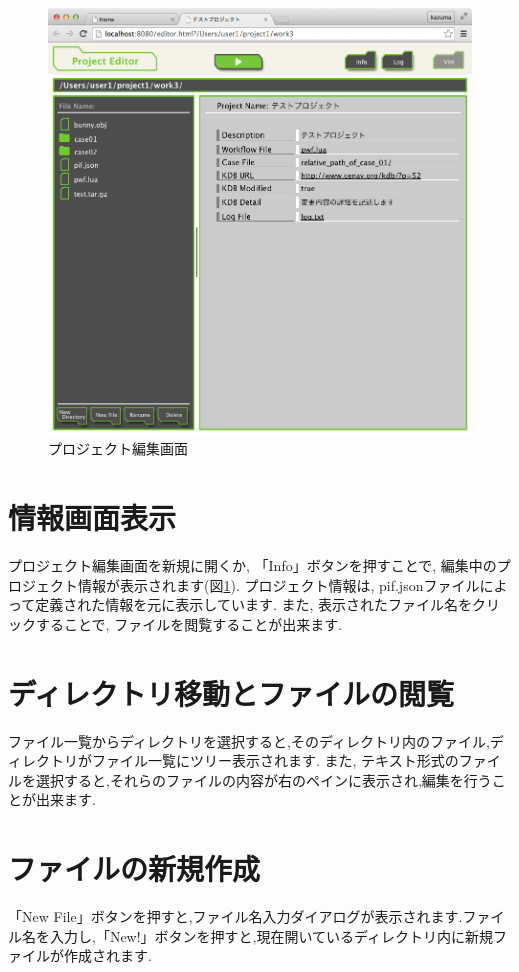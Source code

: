 \documentclass[a4paper,10pt,oneside]{jsbook}
\begin{document}
\begin{figure}[htbp]
	\begin{center}
		\includegraphics[width=12.0cm]{image/projeditor_000.png}
	\end{center}
	\caption{プロジェクト編集画面}
	\label{fig:projeditor}
\end{figure}

\newpage


\section{情報画面表示}
プロジェクト編集画面を新規に開くか, 「Info」ボタンを押すことで, 編集中のプロジェクト情報が表示されます(図\ref{fig:projeditor}). 
プロジェクト情報は, pif.jsonファイルによって定義された情報を元に表示しています.
また, 表示されたファイル名をクリックすることで, ファイルを閲覧することが出来ます.

\section{ディレクトリ移動とファイルの閲覧}
ファイル一覧からディレクトリを選択すると,そのディレクトリ内のファイル,ディレクトリがファイル一覧にツリー表示されます. また, テキスト形式のファイルを選択すると,それらのファイルの内容が右のペインに表示され,編集を行うことが出来ます.

\section{ファイルの新規作成}
「New File」ボタンを押すと,ファイル名入力ダイアログが表示されます.ファイル名を入力し,「New!」ボタンを押すと,現在開いているディレクトリ内に新規ファイルが作成されます.
\end{document}
